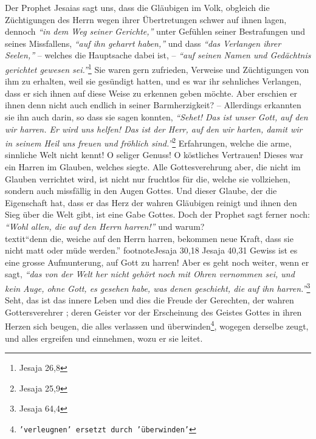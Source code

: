 Der Prophet Jesaias sagt uns, dass die Gläubigen im Volk, obgleich die
Züchtigungen des Herrn wegen ihrer Übertretungen schwer auf ihnen lagen,
dennoch
\textit{"`in dem Weg seiner Gerichte,"'} unter Gefühlen seiner Bestrafungen und
seines Missfallens, \textit{"`auf ihn geharrt haben,"'} und dass \textit{"`das
Verlangen ihrer Seelen,"'} -- welches die Hauptsache dabei ist, --
\textit{"`auf seinen Namen und Gedächtnis gerichtet gewesen
sei."'}\footnote{Jesaja 26,8}
Sie waren gern
zufrieden, Verweise und Züchtigungen von ihm zu erhalten, weil sie gesündigt
hatten, und es war ihr sehnliches Verlangen, dass er sich ihnen auf diese Weise
zu erkennen geben möchte. Aber erschien er ihnen denn
nicht auch endlich in
seiner Barmherzigkeit?  -- Allerdings erkannten sie ihn auch darin, so dass sie
sagen konnten,
\textit{"`Sehet! Das ist unser Gott, auf den wir harren. Er wird uns
helfen! Das ist der Herr, auf den wir harten, damit wir in seinem Heil uns
freuen und fröhlich sind."'}\footnote{Jesaja 25,9}
Erfahrungen, welche die arme,
sinnliche Welt nicht kennt!  O seliger Genuss! O köstliches
Vertrauen! Dieses war
ein Harren im Glauben, welches siegte. Alle Gottesverehrung aber, die nicht im
Glauben verrichtet wird, ist nicht nur fruchtlos
 für die, welche sie vollziehen,
sondern auch missfällig in den Augen Gottes. Und dieser Glaube, der die
Eigenschaft hat, dass er das Herz der wahren Gläubigen reinigt und ihnen den
Sieg über die Welt gibt, ist eine Gabe Gottes. Doch
der Prophet sagt
ferner noch:
\textit{"`Wohl allen, die auf den Herrn harren!"'} und warum?\\textit{"`denn
die, weiche
auf den Herrn harren, bekommen neue Kraft, dass sie nicht matt oder müde
werden."'}
footnote{Jesaja 30,18 Jesaja 40,31}
Gewiss ist es eine grosse Aufmunterung, auf Gott
zu harren! Aber es geht noch weiter, wenn er sagt,
\textit{"`das von der Welt her
nicht gehört noch mit Ohren vernommen sei, und kein Auge, ohne Gott, es gesehen
habe, was denen geschieht, die auf ihn harren."'}\footnote{Jesaja 64,4}
Seht, das ist das innere Leben und dies die Freude der Gerechten, der wahren
Gottersverehrer ;
deren Geister vor der Erscheinung des Geistes Gottes in ihren Herzen sich
beugen, die alles verlassen und überwinden\footnote{\texttt{'verleugnen'
ersetzt
durch 'überwinden'}}, wogegen derselbe zeugt, und alles
ergreifen und einnehmen, wozu er sie leitet.


